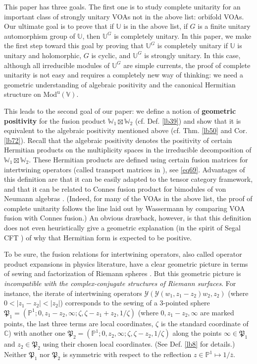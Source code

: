 \documentclass[11pt,b5paper,notitlepage]{article}
\theoremstyle{definition}
\theoremstyle{plain}
\newcommand{\fk}{\mathfrak}
\newcommand{\mc}{\mathcal}
\newcommand{\ovl}{\overline}
\newcommand{\uni}{\mathrm{u}}
\newcommand{\Vbb}{\mathbb V}
\newcommand{\Ubb}{\mathbb U}
\newcommand{\Wbb}{\mathbb W}
\newcommand{\Cbb}{\mathbb C}
\newcommand{\Pbb}{\mathbb P}
\newcommand{\Mod}{\mathrm{Mod}}
\numberwithin{equation}{section}
\begin{document}
This paper has three goals. The first one is to study complete unitarity for an important class of strongly unitary VOAs not in the above list: orbifold VOAs. Our ultimate goal is to prove that if $\Ubb$ is in the above list, if $G$ is a finite unitary automorphism group of $\Ubb$, then $\Ubb^G$ is completely unitary. In this paper, we make the first step toward this goal by proving that $\Ubb^G$ is completely unitary if $\Ubb$ is unitary and holomorphic, $G$ is cyclic, and $\Ubb^G$ is strongly unitary. In this case, although all irreducible modules of $\Ubb^G$ are simple currents, the proof of complete unitarity is not easy and requires a completely new way of thinking: we need a geometric understanding of algebraic positivity and the canonical Hermitian structure on $\Mod^\uni(\Vbb)$.

This leads to the second goal of our paper: we define a notion of \textbf{geometric positivity} for the fusion product $\Wbb_1\boxtimes\Wbb_2$ (cf. Def. \ref{lb39}) and show that it is equivalent to the algebraic positivity mentioned above  (cf. Thm. \ref{lb50} and Cor. \ref{lb72}). Recall that the algebraic positivity denotes the positivity of certain Hermitian products on the multiplicity spaces in the irreducible decomposition of $\Wbb_1\boxtimes\Wbb_2$. These Hermitian products are defined using certain fusion matrices for intertwining operators (called transport matrices in \cite{Gui19b}), see \eqref{eq69}. Advantages of this definition are that it can be easily adapted to the tensor category framework, and that it can be related to Connes fusion product for bimodules of von Neumann algebras \cite{Con94,Sau83}. (Indeed, for many of the VOAs in the above list, the proof of complete unitarity follows the line laid out by Wassermann \cite{Was98} by comparing VOA fusion with Connes fusion.) An obvious drawback, however, is that this definition does not even heuristically give a geometric explanation (in the spirit of Segal CFT \cite{Seg04}) of why that Hermitian form is expected to be positive.

To be sure, the fusion relations for intertwining operators, also called operator product expansions in physics literature, have a clear geometric picture in terms of sewing and factorization of Riemann spheres \cite{HL95a,HL95b,HL95c,Hua95}. But this geometric picture is \emph{incompatible with the complex-conjugate structures of Riemann surfaces}. For instance, the iterate of intertwining operators $\mc Y(\mc Y(w_1,z_1-z_2)w_2,z_2)$ (where $0<|z_1-z_2|<|z_2|$) corresponds to the sewing of a $3$-pointed sphere $\fk P_1=(\Pbb^1;0,z_1-z_2,\infty;\zeta,\zeta-z_1+z_2,1/\zeta)$ (where $0,z_1-z_2,\infty$ are marked points, the last three terms are local coordinates, $\zeta$ is the standard coordinate of $\Cbb$) with another one $\fk P_2=(\Pbb^1;0,z_2,\infty;\zeta,\zeta-z_2,1/\zeta)$ along the points $\infty\in\fk P_1$ and $z_2\in\fk P_2$ using their chosen local coordinates. (See Def. \ref{lb8} for details.) Neither $\fk P_1$ nor $\fk P_2$ is symmetric with respect to the reflection $z\in\Pbb^1\mapsto 1/\ovl z$. 
\end{document}
